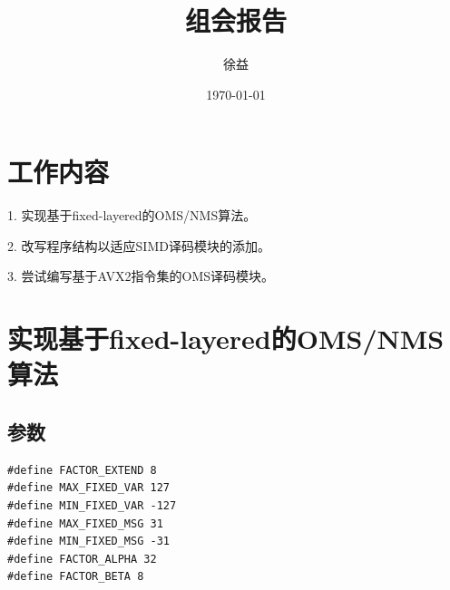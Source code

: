 \documentclass{article}
\title{组会报告}
\author{徐益}
\date{\today}
\begin{document}
\maketitle


\section{工作内容}
1. 实现基于fixed-layered的OMS/NMS算法。

2. 改写程序结构以适应SIMD译码模块的添加。

3. 尝试编写基于AVX2指令集的OMS译码模块。

\section{实现基于fixed-layered的OMS/NMS算法}
\subsection{参数}
\begin{lstlisting}
#define FACTOR_EXTEND 8
#define MAX_FIXED_VAR 127
#define MIN_FIXED_VAR -127
#define MAX_FIXED_MSG 31
#define MIN_FIXED_MSG -31
#define FACTOR_ALPHA 32
#define FACTOR_BETA 8
\end{lstlisting}
\end{document}
